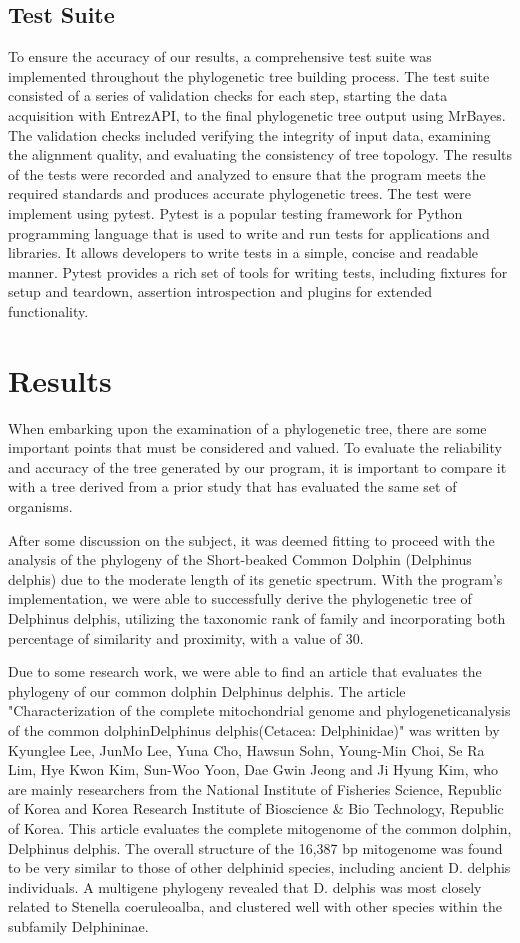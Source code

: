 \documentclass[12pt]{article}
\begin{document}
\subsection{Test Suite}
To ensure the accuracy of our results, a comprehensive test suite was implemented throughout the phylogenetic tree building process. The test suite consisted of a series of validation checks for each step, starting the data acquisition with EntrezAPI, to the final phylogenetic tree output using MrBayes. The validation checks included verifying the integrity of input data, examining the alignment quality, and evaluating the consistency of tree topology. The results of the tests were recorded and analyzed to ensure that the program meets the required standards and produces accurate phylogenetic trees. The test were implement using pytest. Pytest is a popular testing framework for Python programming language that is used to write and run tests for applications and libraries. It allows developers to write tests in a simple, concise and readable manner. Pytest provides a rich set of tools for writing tests, including fixtures for setup and teardown, assertion introspection and plugins for extended functionality.

\section{Results}\label{sec:desenvolvimentos}
When embarking upon the examination of a phylogenetic tree, there are some important points that must be considered and valued. To evaluate the reliability and accuracy of the tree generated by our program, it is important to compare it with a tree derived from a prior study that has evaluated the same set of organisms.

After some discussion on the subject, it was deemed fitting to proceed with the analysis of the phylogeny of the Short-beaked Common Dolphin (Delphinus delphis) due to the moderate length of its genetic spectrum. With the program's implementation, we were able to successfully derive the phylogenetic tree of Delphinus delphis, utilizing the taxonomic rank of family and incorporating both percentage of similarity and proximity, with a value of 30.

Due to some research work, we were able to find an article that evaluates the phylogeny of our common dolphin Delphinus delphis. The article "Characterization of the complete mitochondrial genome and phylogeneticanalysis of the common dolphinDelphinus delphis(Cetacea: Delphinidae)" was written by Kyunglee Lee, JunMo Lee, Yuna Cho, Hawsun Sohn, Young-Min Choi, Se Ra Lim, Hye Kwon Kim, Sun-Woo Yoon, Dae Gwin Jeong and Ji Hyung Kim, who are mainly researchers from the National Institute of Fisheries Science, Republic of Korea and Korea Research Institute of Bioscience \& Bio Technology, Republic of Korea. This article evaluates the complete mitogenome of the common dolphin, Delphinus delphis. The overall structure of the 16,387 bp mitogenome was found to be very similar to those of other delphinid species, including ancient D. delphis individuals. A multigene phylogeny revealed that D. delphis was most closely related to Stenella coeruleoalba, and clustered well with other species within the subfamily Delphininae.
\end{document}
